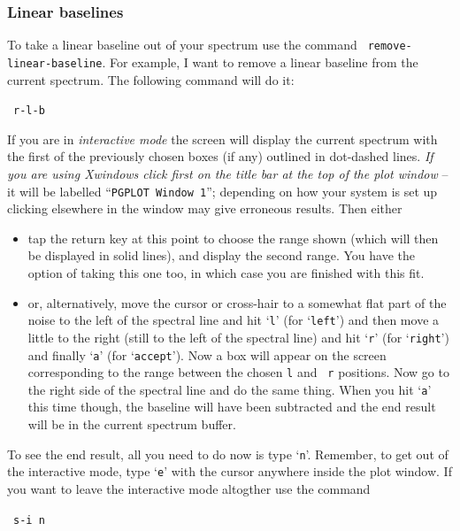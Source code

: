 \subsubsection{Linear baselines}
\label{sec:linear-baselines}
To take a linear baseline out of your spectrum use the command {\tt
remove-linear-baseline}.  For example, I want to remove a linear
baseline from the current spectrum.  The following command will do
it:

\SP\ \verb|r-l-b|

If you are in {\it interactive mode} the screen will display the current
spectrum with the first of the previously chosen boxes (if any)
outlined in dot-dashed lines. {\it If you are using Xwindows click
first on the title bar at the top of the plot window} -- it will be
labelled ``{\tt{PGPLOT Window 1}}''; depending on how your system is
set up clicking elsewhere in the window may give erroneous results. 
Then either 
\begin{itemize}
\item
tap the return key at this point to choose the range shown (which will
then be displayed in solid lines), and display the second range. You
have the option of taking this one too, in which case you are finished
with this fit.
\item
or, alternatively, move the cursor or cross-hair to a somewhat flat
part of the noise to the left of the spectral line and hit `{\tt{l}}'
(for `{\tt{left}}') and then move a little to the right (still to the
left of the spectral line) and hit `{\tt{r}}' (for `{\tt{right}}') and
finally `{\tt{a}}' (for `{\tt{accept}}').  Now a box will appear on the
screen corresponding to the range between the chosen {\tt l} and {\tt
r} positions.  Now go to the right side of the spectral line and do
the same thing.  When you hit `{\tt{a}}' this time though, the baseline
will have been subtracted and the end result will be in the current
spectrum buffer.
\end{itemize}
To see the end result, all you need to do now is type `{\tt{n}}'.
Remember, to get out of the interactive mode, type `{\tt{e}}' with the
cursor anywhere inside the plot window. If you want to leave the
interactive mode altogther use the command

\SP\ \verb|s-i n|
 
